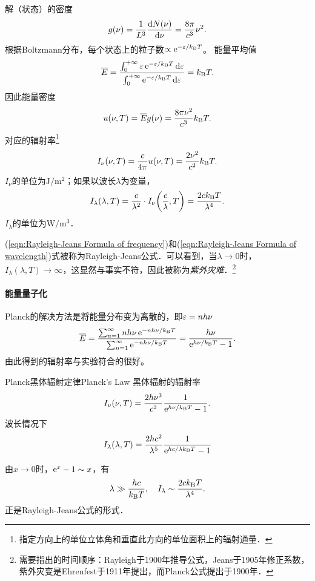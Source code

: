 解（状态）的密度
\[
	g(\nu)=\frac1{L^3}\frac{\mathrm{d}^{\;\!\!}N(\nu)}{\mathrm{d} \nu^{\;\!\!}}=\frac{8\pi}{c^3}\nu^2.
\]
根据Boltzmann分布，每个状态上的粒子数$\propto\mathop{}\!\mathrm{e}^{-\varepsilon/k_{\mathrm B} T}$。
能量平均值
\begin{align}
	\overline E=\frac{\textstyle\int_0^{+\infty}\varepsilon\mathop{}\!\mathrm{e}^{-\varepsilon/k_{\mathrm B} T}\mathop{}\!\mathrm{d}\varepsilon}{\textstyle\int_0^{+\infty}\mathop{}\!\mathrm{e}^{-\varepsilon/k_{\mathrm B} T}\mathop{}\!\mathrm{d}\varepsilon}=k_{\mathrm B} T.
\end{align}
因此能量密度
\[
u(\nu,T)=\overline Eg(\nu)=\frac{8\pi\nu^2}{c^3}k_{\mathrm B} T.
\]
对应的辐射率\footnote{指定方向上的单位立体角和垂直此方向的单位面积上的辐射通量．}
\begin{align}
	\label{eqn:Rayleigh-Jeans Formula of frequency}
	I_\nu(\nu,T)=\frac c{4\pi}u(\nu,T)=\frac{2\nu^2}{c^2}k_{\mathrm B} T.
\end{align}
$I_\nu$的单位为$\si{\J\per\m\squared}$；如果以波长$\lambda$为变量，%
\begin{align}
	\label{eqn:Rayleigh-Jeans Formula of wavelength}
	I_\lambda(\lambda,T)=\frac{c}{\lambda^2}\cdot I_\nu\biggl(\frac c\lambda,T\biggr)=\frac{2ck_{\mathrm B} T}{\lambda^4}.
\end{align}
$I_\lambda$的单位为$\si{\W\per\m\cubed}$．

(\ref{eqn:Rayleigh-Jeans Formula of frequency})和(\ref{eqn:Rayleigh-Jeans Formula of wavelength})式被称为Rayleigh-Jeans公式．可以看到，当$\lambda\to0$时，$I_\lambda(\lambda,T)\to\infty$，这显然与事实不符，因此被称为\textit{紫外灾难}．\footnote{需要指出的时间顺序：Rayleigh于1900年推导公式，Jeans于1905年修正系数，紫外灾变是Ehrenfest于1911年提出，而Planck公式提出于1900年．}
\paragraph{能量量子化}
Planck的解决方法是将能量分布变为离散的，即$\varepsilon=nh\nu$
\begin{align}
	\overline E=\frac{\textstyle\sum_{n=1}^\infty nh\nu\mathop{}\!\mathrm{e}^{-nh\nu/k_{\mathrm B} T}}{\textstyle\sum_{n=1}^\infty\mathop{}\!\mathrm{e}^{-nh\nu/k_{\mathrm B} T}}=\frac{h\nu}{\mathop{}\!\mathrm{e}^{h\nu/k_{\mathrm B} T}-1}.
\end{align}
由此得到的辐射率与实验符合的很好。
\begin{theorem}{Planck黑体辐射定律}{Planck's Law}
	黑体辐射的辐射率
	\begin{align}
		I_\nu(\nu,T)=\frac{2h\nu^3}{c^2}\frac{1}{\mathop{}\!\mathrm{e}^{h\nu/k_{\mathrm B} T}-1}.
	\end{align}
	波长情况下
	\begin{align}
		I_\lambda(\lambda,T)=\frac{2hc^2}{\lambda^5}\frac{1}{\mathop{}\!\mathrm{e}^{hc/\lambda k_{\mathrm B} T}-1}
	\end{align}
\end{theorem}
由$x\to0$时，$\mathop{}\!\mathrm{e}^ x-1\sim x$，有
\[
	\lambda\gg\frac{hc}{k_{\mathrm B} T},\quad I_\lambda\sim\frac{2ck_{\mathrm B} T}{\lambda^4}.
\]
正是Rayleigh-Jeans公式的形式．

